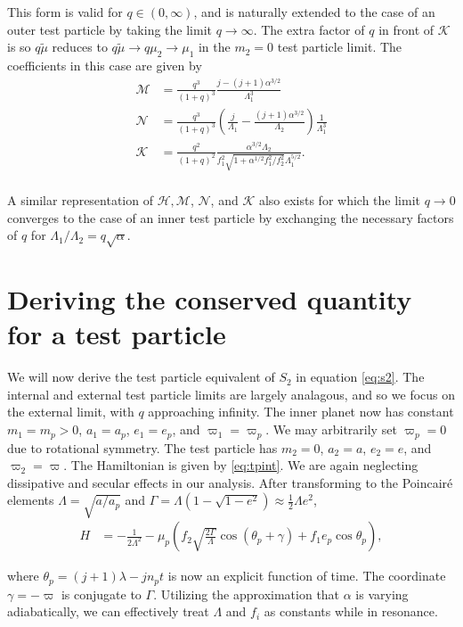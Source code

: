 \documentclass[usenatbib,twocolumn]{mnras}
\begin{document}
\noindent This form is valid for \(q\in (0,\infty)\), and is
naturally extended to the case of an outer test particle by taking the
limit \(q\to\infty\).  The extra factor of \(q\) in front of \(\mathcal K\)
is so \(q\tilde\mu\) reduces to \(q\tilde\mu\to q\mu_2 \to \mu_1\) in the
\(m_2=0\) test particle limit.  The coefficients in this case are given
by
\begin{align}
  \mathcal M
  &= \frac{q^3}{(1+q)^3}\frac{j-(j+1)\alpha^{3/2}}{\Lambda_1^3}\\
  \mathcal N
  &= \frac{q^3}{(1+q)^3}\left(
    \frac{j}{\Lambda_1} - \frac{(j+1)\alpha^{3/2}}{\Lambda_2}
    \right)\frac{1}{\Lambda_1^3}\\
  \mathcal K
  &= \frac{q^2}{(1+q)^2}
    \frac{\alpha^{3/2}\Lambda_2}{f_1^2\sqrt{1+\alpha^{1/2}f_1^2/f_2^2}\Lambda_1^{5/2}}.\\
\end{align}

A similar representation of \(\mathcal H, \mathcal M\), \(\mathcal N\),
and \(\mathcal{K}\) also exists for which the limit \(q\to 0\) converges
to the case of an inner test particle by exchanging the necessary
factors of \(q\) for \(\Lambda_1/\Lambda_2 = q\sqrt\alpha\).
\section{Deriving the conserved quantity for a test particle}
\label{sec:orgeb4a36a}
We will now derive the test particle equivalent of \(S_2\) in equation
\eqref{eq:s2}.  The internal and external test particle limits are
largely analagous, and so we focus on the external limit, with \(q\)
approaching infinity.  The inner planet now has constant \(m_1=m_p>0\),
\(a_1=a_p\), \(e_1=e_p\), and \(\varpi_1=\varpi_p\). We may arbitrarily set
\(\varpi_p=0\) due to rotational symmetry.  The test particle has
\(m_2=0\), \(a_2=a\), \(e_2=e\), and \(\varpi_2=\varpi\).  The Hamiltonian is
given by \eqref{eq:tpint}.  We are again neglecting dissipative and
secular effects in our analysis.  After transforming to the
Poincair\'e elements \(\Lambda=\sqrt{a/a_p}\) and
\(\Gamma=\Lambda(1-\sqrt{1-e^2})\approx \frac12\Lambda e^2\),
\begin{align}
\label{eq:tpresH}
  H
  &= - \frac{1}{2\Lambda^2} - \mu_p\left(f_2
    \sqrt{\frac{2\Gamma}{\Lambda}}\cos(\theta_p+\gamma) + f_1 e_p\cos\theta_p\right),
\end{align}

\noindent
where \(\theta_p = (j+1)\lambda - jn_pt\) is now an explicit
function of time. The coordinate \(\gamma=-\varpi\) is conjugate
to \(\Gamma\). Utilizing the approximation that \(\alpha\) is varying
adiabatically, we can effectively treat \(\Lambda\) and \(f_i\) as
constants while in resonance. 
\end{document}
